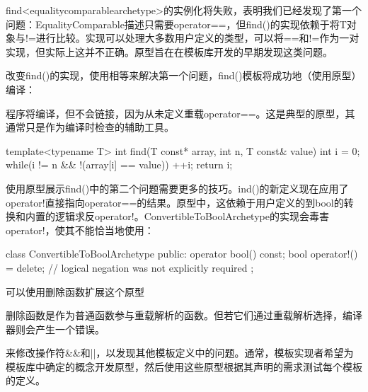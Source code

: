 find<equalitycomparablearchetype>的实例化将失败，表明我们已经发现了第一个问题：EqualityComparable描述只需要operator==，但find()的实现依赖于将T对象与!=进行比较。实现可以处理大多数用户定义的类型，可以将==和!=作为一对实现，但实际上这并不正确。原型旨在在模板库开发的早期发现这类问题。

改变find()的实现，使用相等来解决第一个问题，find()模板将成功地（使用原型）编译：

\begin{notice}
程序将编译，但不会链接，因为从未定义重载operator==。这是典型的原型，其通常只是作为编译时检查的辅助工具。
\end{notice}

\begin{cpp}
template<typename T>
int find(T const* array, int n, T const& value) {
	int i = 0;
	while(i != n && !(array[i] == value))
		++i;
	return i;
}
\end{cpp}

使用原型展示find()中的第二个问题需要更多的技巧。ind()的新定义现在应用了operator!直接指向operator==的结果。原型中，这依赖于用户定义的到bool的转换和内置的逻辑求反operator!。ConvertibleToBoolArchetype的实现会毒害operator!，使其不能恰当地使用：

\begin{cpp}
class ConvertibleToBoolArchetype
{
	public:
	operator bool() const;
	bool operator!() = delete; // logical negation was not explicitly required
};
\end{cpp}

可以使用删除函数扩展这个原型

\begin{notice}
删除函数是作为普通函数参与重载解析的函数。但若它们通过重载解析选择，编译器则会产生一个错误。
\end{notice}

来修改操作符\&\&和||，以发现其他模板定义中的问题。通常，模板实现者希望为模板库中确定的概念开发原型，然后使用这些原型根据其声明的需求测试每个模板的定义。























